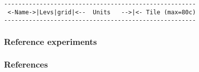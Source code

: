 \begin{table}[h!]
\centering
\label{tab:pkg:obcs:diagnostics}
{\footnotesize
\begin{verbatim}
------------------------------------------------------
 <-Name->|Levs|grid|<--  Units   -->|<- Tile (max=80c)
------------------------------------------------------

\end{verbatim}
}
\caption{~}
\end{table}


\subsubsection{Reference experiments}




\subsubsection{References}

